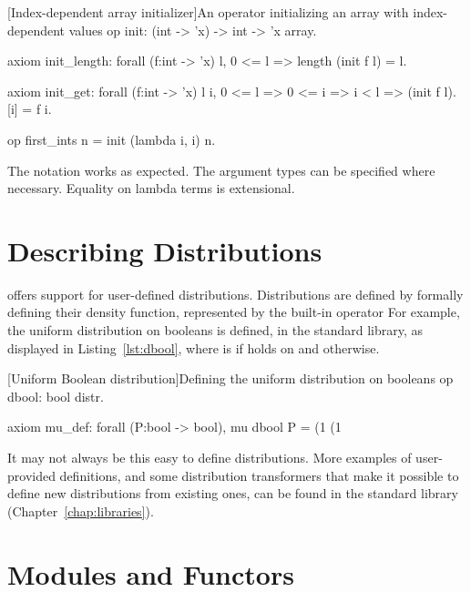 \begin{easycrypt}[label={lst:init_arrays}]{[Index-dependent array initializer]An operator initializing an array with index-dependent values}
op init: (int -> 'x) -> int -> 'x array.

axiom init_length: forall (f:int -> 'x) l,
  0 <= l => length (init f l) = l.

axiom init_get: forall (f:int -> 'x) l i,
  0 <= l => 0 <= i => i < l =>
  (init f l).[i] = f i.

op first_ints n = init (lambda i, i) n.
\end{easycrypt}

The  notation works as expected. The argument types can be
specified where necessary. Equality on lambda terms is extensional.

\section{Describing Distributions\label{sec:distributions}}

\EC offers support for user-defined distributions. Distributions are defined by
formally defining their density function, represented by the built-in operator
 For example, the uniform
distribution on booleans is defined, in the standard library, as displayed in
Listing~\ref{lst:dbool}, where  is  if 
holds on  and  otherwise.

\begin{easycrypt}[label={lst:dbool}]{[Uniform Boolean distribution]Defining the uniform distribution on booleans}
op dbool: bool distr.

axiom mu_def: forall (P:bool -> bool), 
  mu dbool P =
    (1%
    (1%
\end{easycrypt}

It may not always be this easy to define distributions. More examples of
user-provided definitions, and some distribution transformers that make it
possible to define new distributions from existing ones, can be found in the
standard library (Chapter~\ref{chap:libraries}).


\section{Modules and Functors\label{sec:modules}}

